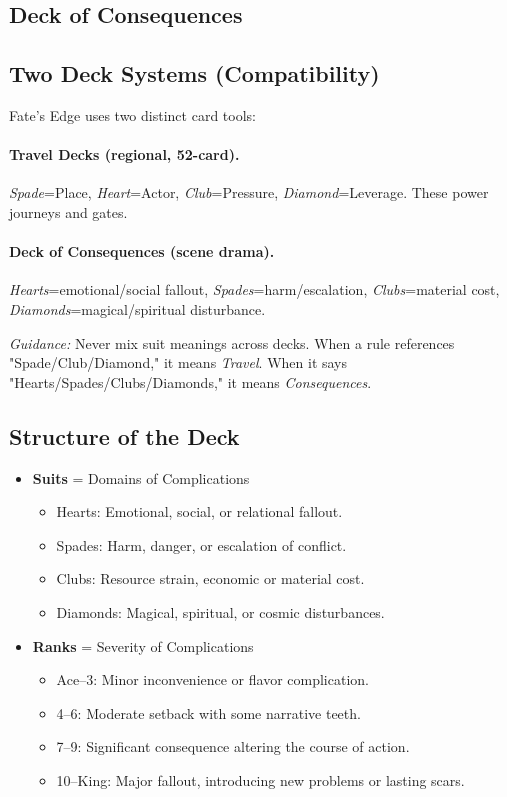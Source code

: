\documentclass[11pt]{article}
\begin{document}
\subsection{Deck of Consequences}

\subsection{Two Deck Systems (Compatibility)}
Fate's Edge uses two distinct card tools:

\paragraph{Travel Decks (regional, 52-card).}
\emph{Spade}=Place, \emph{Heart}=Actor, \emph{Club}=Pressure, \emph{Diamond}=Leverage. These power journeys and gates.

\paragraph{Deck of Consequences (scene drama).}
\emph{Hearts}=emotional/social fallout, \emph{Spades}=harm/escalation, \emph{Clubs}=material cost, \emph{Diamonds}=magical/spiritual disturbance.

\textit{Guidance:} Never mix suit meanings across decks. When a rule references "Spade/Club/Diamond," it means \emph{Travel}. When it says "Hearts/Spades/Clubs/Diamonds," it means \emph{Consequences}.

\subsection{Structure of the Deck}
\begin{itemize}
    \item \textbf{Suits} = Domains of Complications
    \begin{itemize}
        \item Hearts: Emotional, social, or relational fallout.
        \item Spades: Harm, danger, or escalation of conflict.
        \item Clubs: Resource strain, economic or material cost.
        \item Diamonds: Magical, spiritual, or cosmic disturbances.
    \end{itemize}
    \item \textbf{Ranks} = Severity of Complications
    \begin{itemize}
        \item Ace–3: Minor inconvenience or flavor complication.
        \item 4–6: Moderate setback with some narrative teeth.
        \item 7–9: Significant consequence altering the course of action.
        \item 10–King: Major fallout, introducing new problems or lasting scars.
    \end{itemize}
\end{itemize}
\end{document}
